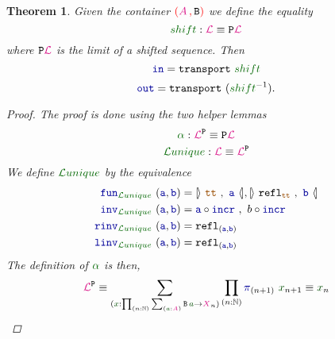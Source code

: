 \documentclass[twoside,11pt,openright]{report}
\theoremstyle{plain} %
\newtheorem{thm}{Theorem}[section]
\theoremstyle{definition}
\theoremstyle{remark}
\newcommand*{\term}[1]{\textcolor{green!30!black}{#1}} %
\newcommand*{\pathterm}[1]{\textcolor{green!40!black}{#1}}
\newcommand*{\type}[1]{\textcolor{magenta!90!black}{#1}}
\newcommand*{\containerpair}[2]{\textcolor{red}{(}#1\,\textcolor{red}{,}\,#2\textcolor{red}{)}}
\newcommand*{\constant}[1]{\textcolor{orange!60!black}{\ensuremath{\mathtt{#1}}}}
\newcommand*{\function}[1]{\textcolor{blue!60!black}{\ensuremath{\mathtt{#1}}}}
\newcommand*{\typeformer}[1]{\ensuremath{\mathtt{#1}}}
\newcommand*{\functor}[1]{\ensuremath{\mathbf{\mathtt{#1}}}}
\newcommand*{\natcases}[2]{\ensuremath{\mathbb{[\hspace{-.5mm}\rangle}~\ensuremath{#1}~,~\ensuremath{#2}~\mathbb{\langle\hspace{-.5mm}]}}}
\newcommand*{\sym}[1]{\ensuremath{#1^{-1}}}
\begin{document}
\begin{thm}
   Given the container \(\containerpair{\type{A}}{\typeformer{B}}\) we define the equality
  \begin{equation}
    \pathterm{shift} : \type{\mathcal{L}} \equiv \functor{P}\type{\mathcal{L}}
  \end{equation}
  where \(\functor{P}\type{\mathcal{L}}\) is the limit of a shifted sequence. Then
  \begin{equation}
    \function{in} = \mathtt{transport}~\pathterm{shift}
  \end{equation}
  \begin{equation}
    \function{out} = \mathtt{transport}~(\sym{\pathterm{shift}}).
  \end{equation}
  \begin{proof}
    The proof is done using the two helper lemmas
    \begin{equation}
      \pathterm{\alpha} : \type{\mathcal{L}}^{\functor{P}} \equiv \functor{P}\type{\mathcal{L}}
    \end{equation}
    \begin{equation}
      \pathterm{\mathcal{L}unique} : \type{\mathcal{L}} \equiv \type{\mathcal{L}}^{\functor{P}}
    \end{equation}
    We define \(\pathterm{\mathcal{L}unique}\) by the equivalence
    \begin{align}
      \function{fun}_{\pathterm{\mathcal{L}unique}}~(\function{a} , \function{b}) &= \natcases{\constant{tt}}{\function{a}} , \natcases{\mathtt{refl}_{\constant{tt}}}{\function{b}} \\
    \function{inv}_{\pathterm{\mathcal{L}unique}}~(\function{a} , \function{b}) &= \function{a} \circ \function{incr}~,~b \circ \function{incr} \\
    \function{rinv}_{\pathterm{\mathcal{L}unique}}~(\function{a} , \function{b}) &= \mathtt{refl}_{(\function{a},\function{b})} \\
    \function{linv}_{\pathterm{\mathcal{L}unique}}~(\function{a} , \function{b}) &= \mathtt{refl}_{(\function{a},\function{b})}
    \end{align}
    The definition of \(\pathterm{\alpha}\) is then, 
    \begin{align}
      \type{\mathcal{L}}^{\functor{P}} &\equiv \sum_{(\term{x} : \prod_{(n : \mathbb{N})} \sum_{(\term{a} : \type{A})} \typeformer{B}\,\term{a} \rightarrow \type{X}_n)} \prod_{(n : \mathbb{N})} \function{\pi}_{(n+1)}~\term{x}_{n+1} \equiv \term{x}_{n} \\

\end{align}
\end{proof}
\end{thm}
\end{document}
